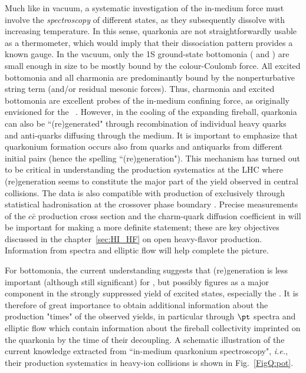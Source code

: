 \documentclass[../report.tex]{subfiles}
\begin{document}
Much like in vacuum, a systematic investigation of the in-medium force must involve the {\em spectroscopy} of different states, as they subsequently dissolve with increasing temperature. In this sense, quarkonia are not straightforwardly usable as a thermometer, which would imply that their dissociation pattern provides a known gauge. In the vacuum, only the 1S ground-state bottomonia ( and \PGhb) are small enough in size to be mostly bound by the colour-Coulomb force. All excited bottomonia and all charmonia are predominantly bound by the nonperturbative string term (and/or residual mesonic forces). 
Thus, charmonia and excited bottomonia are excellent probes of the in-medium confining force, as originally envisioned for the \PJgy~\cite{Matsui:1986dk}.
However, in the cooling of the expanding fireball, quarkonia can also be ``(re)generated" through recombination of individual heavy quarks and anti-quarks diffusing through the medium. It is important to emphasize that quarkonium formation occurs also from quarks and antiquarks from different initial pairs (hence the spelling ``(re)generation").
This mechanism \cite{BraunMunzinger:2000px,Thews:2000rj} has turned out to be critical in understanding the \PJgy production systematics at the LHC where (re)generation seems to constitute the major part of the yield observed in central \PbPb collisions.
The data is also compatible with production of \PJgy exclusively through statistical hadronisation at the crossover phase boundary \cite{Andronic:2017pug}.
Precise measurements of the $c\bar{c}$ production cross section and the charm-quark diffusion coefficient in \RunsThreeFour will be important for making a more definite statement; these are key objectives discussed in the chapter~\ref{sec:HI_HF} on open heavy-flavor production. Information from \pt spectra and elliptic flow will help complete the picture.

For bottomonia, the current understanding suggests that (re)generation is less important (although still significant) for , but possibly figures as a major component in the strongly suppressed yield of excited states, especially the . It is therefore of great importance to obtain additional information about the production "times" of the observed yields, in particular through $\pt$ spectra and elliptic flow which contain information about the fireball collectivity imprinted on the quarkonia by the time of their decoupling. A schematic illustration of the current knowledge extracted from ``in-medium quarkonium spectroscopy", {\it i.e.}, their production systematics in heavy-ion collisions is shown in Fig.~\ref{FigQ:pot}.        
\end{document}
